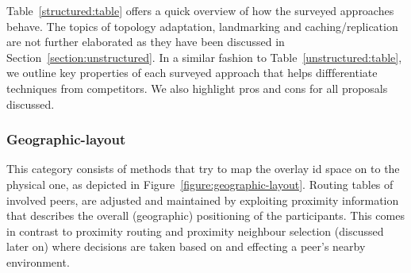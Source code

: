 Table~\ref{structured:table} offers a quick overview of how the surveyed 
approaches behave.
The topics of topology adaptation, landmarking and caching/replication
are not further elaborated as they have been discussed 
in Section~\ref{section:unstructured}.
In a similar fashion to Table~\ref{unstructured:table}, 
we outline key properties of each surveyed approach 
that helps diffferentiate techniques from competitors.
We also highlight pros and cons for all proposals discussed.

\subsubsection{Geographic-layout} \label{section:geographic_layout}


This category consists of methods that try to map the overlay id space on to
the physical one, as depicted in Figure~\ref{figure:geographic-layout}.
Routing tables of involved peers, are adjusted and maintained by exploiting
proximity information that describes the overall (geographic) positioning of
the participants. This comes in contrast to proximity routing and proximity neighbour
selection (discussed later on) where decisions are taken based on and effecting
a peer's nearby environment.

